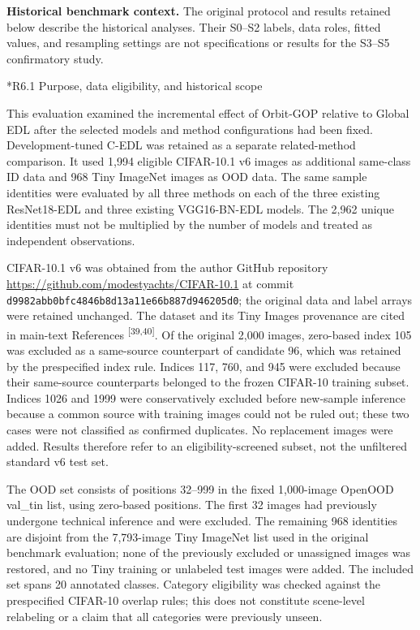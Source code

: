 \documentclass[11pt,a4paper]{article}
\makeatletter
\renewcommand\subsection{\@startsection{subsection}{2}{\z@}{-1.8ex plus -.5ex minus -.2ex}{.7ex plus .2ex}{\normalfont\normalsize\bfseries\raggedright}}
\makeatother
\begin{document}
\noindent\textbf{Historical benchmark context.} The original protocol and results retained below describe the historical analyses. Their S0--S2 labels, data roles, fitted values, and resampling settings are not specifications or results for the S3--S5 confirmatory study.

\subsection*{R6.1 Purpose, data eligibility, and historical scope}\label{s6.1-purpose-data-eligibility-and-historical-scope}

This evaluation examined the incremental effect of Orbit-GOP relative to Global EDL after the selected models and method configurations had been fixed. Development-tuned C-EDL was retained as a separate related-method comparison. It used 1,994 eligible CIFAR-10.1 v6 images as additional same-class ID data and 968 Tiny ImageNet images as OOD data. The same sample identities were evaluated by all three methods on each of the three existing ResNet18-EDL and three existing VGG16-BN-EDL models. The 2,962 unique identities must not be multiplied by the number of models and treated as independent observations.

CIFAR-10.1 v6 was obtained from the author GitHub repository {\def\UrlBreaks{\do\/\do\.\do\-\do\a\do\b\do\c\do\d\do\e\do\f\do\g\do\h\do\i\do\j\do\k\do\l\do\m\do\n\do\o\do\p\do\q\do\r\do\s\do\t\do\u\do\v\do\w\do\x\do\y\do\z}\url{https://github.com/modestyachts/CIFAR-10.1}} at commit \texttt{d9982abb\allowbreak{}0bfc4846\allowbreak{}b8d13a11\allowbreak{}e66b887d\allowbreak{}946205d0}; the original data and label arrays were retained unchanged. The dataset and its Tiny Images provenance are cited in main-text References \textsuperscript{{[}39,40{]}}. Of the original 2,000 images, zero-based index 105 was excluded as a same-source counterpart of candidate 96, which was retained by the prespecified index rule. Indices 117, 760, and 945 were excluded because their same-source counterparts belonged to the frozen CIFAR-10 training subset. Indices 1026 and 1999 were conservatively excluded before new-sample inference because a common source with training images could not be ruled out; these two cases were not classified as confirmed duplicates. No replacement images were added. Results therefore refer to an eligibility-screened subset, not the unfiltered standard v6 test set.

The OOD set consists of positions 32--999 in the fixed 1,000-image OpenOOD val\_tin list, using zero-based positions. The first 32 images had previously undergone technical inference and were excluded. The remaining 968 identities are disjoint from the 7,793-image Tiny ImageNet list used in the original benchmark evaluation; none of the previously excluded or unassigned images was restored, and no Tiny training or unlabeled test images were added. The included set spans 20 annotated classes. Category eligibility was checked against the prespecified CIFAR-10 overlap rules; this does not constitute scene-level relabeling or a claim that all categories were previously unseen.
\end{document}
